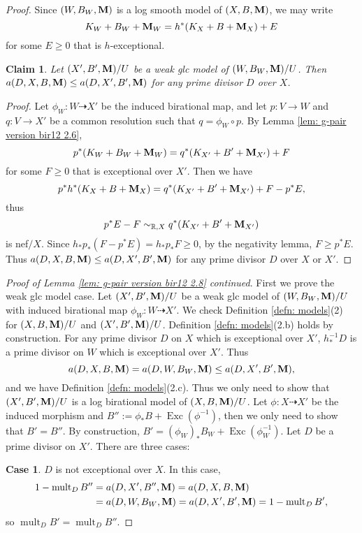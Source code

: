 \documentclass[11pt]{amsart}
\numberwithin{equation}{section}
\newcommand{\Mm}{{\bf{M}}}
\newcommand{\Rr}{\mathbb{R}}
\newcommand{\Exc}{\operatorname{Exc}}
\newcommand{\mult}{\operatorname{mult}}
\newtheorem{claim}[thm]{Claim}
\theoremstyle{definition}
\theoremstyle{definition}
\theoremstyle{definition}
\begin{document}
\begin{proof}
Since $(W,B_W,\Mm)$ is a log smooth model of $(X,B,\Mm)$, we may write
$$K_W+B_W+\Mm_W=h^*(K_X+B+\Mm_X)+E$$
for some $E\geq 0$ that is $h$-exceptional.

\begin{claim}\label{claim: log smooth model log discrepancy compare}
Let $(X',B',\Mm)/U$ be a weak glc model of $(W,B_W,\Mm)/U$. Then $a(D,X,B,\Mm)\leq a(D,X',B',\Mm)$ for any prime divisor $D$ over $X$.
\end{claim}
\begin{proof}
Let $\phi_W: W\dashrightarrow X'$ be the induced birational map, and let $p: V\rightarrow W$ and $q: V\rightarrow X'$ be a common resolution such that $q=\phi_W\circ p$. By Lemma \ref{lem: g-pair version bir12 2.6},
$$p^*(K_W+B_W+\Mm_W)=q^*(K_{X'}+B'+\Mm_{X'})+F$$
for some $F\geq 0$ that is exceptional over $X'$. Then we have
$$p^*h^*(K_X+B+\Mm_X)=q^*(K_{X'}+B'+\Mm_{X'})+F-p^*E,$$
thus
$$p^*E-F\sim_{\Rr,X}q^*(K_{X'}+B'+\Mm_{X'})$$
is nef$/X$. Since $h_*p_*(F-p^*E)=h_*p_*F\geq 0$, by the negativity lemma, $F\geq p^*E$. Thus $a(D,X,B,\Mm)\leq a(D,X',B',\Mm)$ for any prime divisor $D$ over $X$ or $X'$.
\end{proof}

\noindent\textit{Proof of Lemma \ref{lem: g-pair version bir12 2.8} continued}. First we prove the weak glc model case. Let $(X',B',\Mm)/U$ be a weak glc model of $(W,B_W,\Mm)/U$ with induced birational map $\phi_W: W\dashrightarrow X'$. We check Definition \ref{defn: models}(2) for $(X,B,\Mm)/U$ and $(X',B',\Mm)/U$. Definition \ref{defn: models}(2.b) holds by construction. For any prime divisor $D$ on $X$ which is exceptional over $X'$, $h^{-1}_*D$ is a prime divisor on $W$ which is exceptional over $X'$. Thus
$$a(D,X,B,\Mm)=a(D,W,B_W,\Mm)\leq a(D,X',B',\Mm),$$
and we have Definition \ref{defn: models}(2.c). Thus we only need to show that $(X',B',\Mm)/U$ is a log birational model of $(X,B,\Mm)/U$. Let $\phi: X\dashrightarrow X'$ be the induced morphism and $B'':=\phi_*B+\Exc(\phi^{-1})$, then we only need to show that $B'=B''$. By construction, $B'=(\phi_W)_*B_W+\Exc(\phi_W^{-1})$. Let $D$ be a prime divisor on $X'$. There are three cases:

\medskip

\noindent\textbf{Case 1}. $D$ is not exceptional over $X$. In this case,
\begin{align*}
    1-\mult_DB''&=a(D,X',B'',\Mm)=a(D,X,B,\Mm)\\
    &=a(D,W,B_W,\Mm)=a(D,X',B',\Mm)=1-\mult_DB',
\end{align*}
so $\mult_DB'=\mult_DB''$.


\end{proof}
\end{document}
